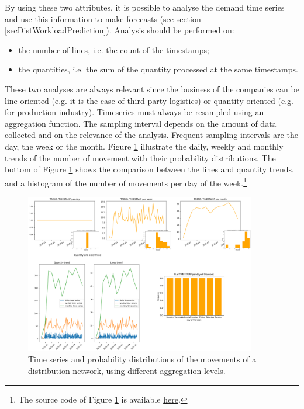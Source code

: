 By using these two attributes, it is possible to analyse the demand time series and use this information to make forecasts (see section \ref{secDistWorkloadPrediction}). Analysis should be performed on:

\begin{itemize}
    \item the number of lines, i.e. the count of the timestamps;
    \item the quantities, i.e. the sum of the quantity processed at the same timestamps.

\end{itemize}

These two analyses are always relevant since the business of the companies can be line-oriented (e.g. it is the case of third party logistics) or quantity-oriented (e.g. for production industry). Timeseries must always be resampled using an aggregation function. The sampling interval depends on the amount of data collected and on the relevance of the analysis. Frequent sampling intervals are the day, the week or the month. Figure \ref{fig_demandTimeseries} illustrate the daily, weekly and monthly trends of the number of movement with their probability distributions. The bottom of Figure \ref{fig_demandTimeseries} shows the comparison between the lines and quantity trends, and a histogram of the number of movements per day of the week.\footnote{The source code of Figure \ref{fig_demandTimeseries} is available \href{https://github.com/aletuf93/logproj/blob/master/examples/LOG_01\%20Demand\%20assessment.ipynb}{here}.}

\begin{figure}[hbt!]
\centering
\includegraphics[width=0.9\textwidth]{SectionDistribution/control_figures/fig_demandTimeseries.png}
\captionsetup{type=figure}
\caption{Time series and probability distributions of the movements of a distribution network, using different aggregation levels.}
\label{fig_demandTimeseries}
\end{figure}

